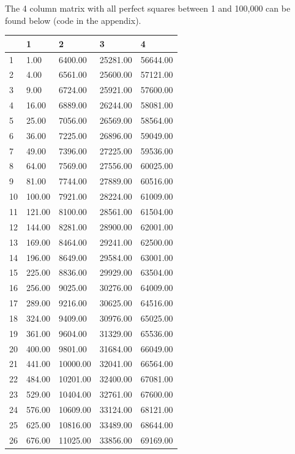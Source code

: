 \documentclass{amsart}
\begin{document}
The 4 column matrix with all perfect squares between 1 and 100,000
can be found below (code in the appendix).
\begin{table}[ht]
\centering
\begin{tabular}{lllll}
  \hline
 & 1 & 2 & 3 & 4 \\
  \hline
1 & 1.00 & 6400.00 & 25281.00 & 56644.00 \\
  2 & 4.00 & 6561.00 & 25600.00 & 57121.00 \\
  3 & 9.00 & 6724.00 & 25921.00 & 57600.00 \\
  4 & 16.00 & 6889.00 & 26244.00 & 58081.00 \\
  5 & 25.00 & 7056.00 & 26569.00 & 58564.00 \\
  6 & 36.00 & 7225.00 & 26896.00 & 59049.00 \\
  7 & 49.00 & 7396.00 & 27225.00 & 59536.00 \\
  8 & 64.00 & 7569.00 & 27556.00 & 60025.00 \\
  9 & 81.00 & 7744.00 & 27889.00 & 60516.00 \\
  10 & 100.00 & 7921.00 & 28224.00 & 61009.00 \\
  11 & 121.00 & 8100.00 & 28561.00 & 61504.00 \\
  12 & 144.00 & 8281.00 & 28900.00 & 62001.00 \\
  13 & 169.00 & 8464.00 & 29241.00 & 62500.00 \\
  14 & 196.00 & 8649.00 & 29584.00 & 63001.00 \\
  15 & 225.00 & 8836.00 & 29929.00 & 63504.00 \\
  16 & 256.00 & 9025.00 & 30276.00 & 64009.00 \\
  17 & 289.00 & 9216.00 & 30625.00 & 64516.00 \\
  18 & 324.00 & 9409.00 & 30976.00 & 65025.00 \\
  19 & 361.00 & 9604.00 & 31329.00 & 65536.00 \\
  20 & 400.00 & 9801.00 & 31684.00 & 66049.00 \\
  21 & 441.00 & 10000.00 & 32041.00 & 66564.00 \\
  22 & 484.00 & 10201.00 & 32400.00 & 67081.00 \\
  23 & 529.00 & 10404.00 & 32761.00 & 67600.00 \\
  24 & 576.00 & 10609.00 & 33124.00 & 68121.00 \\
  25 & 625.00 & 10816.00 & 33489.00 & 68644.00 \\
  26 & 676.00 & 11025.00 & 33856.00 & 69169.00 \\

\end{tabular}
\end{table}
\end{document}
